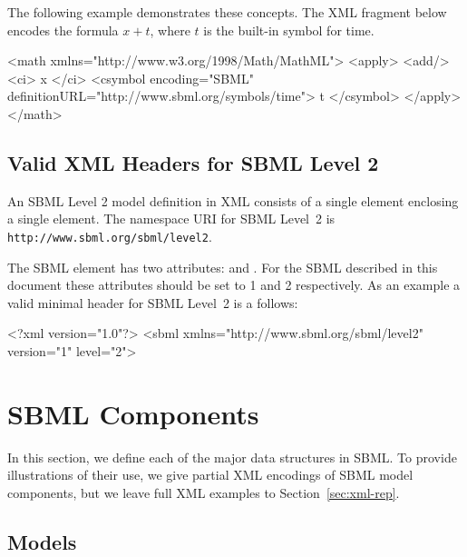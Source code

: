 \documentclass[10pt,twocolumntoc]{cekarticle}
\begin{document}
The following example demonstrates these concepts.  The XML fragment below
encodes the formula $x + t$, where $t$ is the built-in symbol for time.

\begin{example}
<math xmlns="http://www.w3.org/1998/Math/MathML">
    <apply>
        <add/>
        <ci> x </ci>
        <csymbol encoding="SBML" definitionURL="http://www.sbml.org/symbols/time">
            t
        </csymbol>
    </apply>
</math>
\end{example}

\subsection{Valid XML Headers for SBML Level 2}
\label{sec:header}

An SBML Level 2 model definition in XML consists of a single 
element enclosing a single  element.  The namespace URI for
SBML Level~2 is \texttt{http://www.sbml.org/sbml/level2}.

The SBML element has two attributes:  and
.  For the SBML described in this document these
attributes should be set to 1 and 2 respectively.  As an example a
valid minimal header for SBML Level~2 is a follows:

\begin{example}
<?xml version="1.0"?>
<sbml xmlns="http://www.sbml.org/sbml/level2" version="1" level="2">
\end{example}


\section{SBML Components}
\label{sec:elements}

In this section, we define each of the major data structures in SBML. To
provide illustrations of their use, we give partial XML encodings of SBML
model components, but we leave full XML examples to
Section~\ref{sec:xml-rep}.


\subsection{Models}
\label{sec:model}
\end{document}
